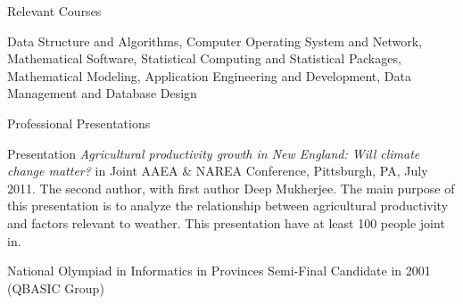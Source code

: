 \documentclass{resume} %
\newcommand{\tab}[1]{\hspace{.2667\textwidth}\rlap{#1}}
\newcommand{\itab}[1]{\hspace{0em}\rlap{#1}}
\begin{document}
\begin{rSection}{Relevant Courses} \itemsep -3pt
\item Data Structure and Algorithms, Computer Operating System and Network, Mathematical Software, Statistical Computing and Statistical Packages, Mathematical Modeling, Application Engineering and Development, Data Management and Database Design 

\end{rSection}

\begin{rSection}{Professional Presentations}{}{} \itemsep -3pt
\begin{rSubsection}{}{}{}{}
\item Presentation \textit{Agricultural productivity growth in New England: Will climate change matter?} in Joint AAEA \& NAREA Conference, Pittsburgh, PA, July 2011.
The second author, with first author Deep Mukherjee. The main purpose of this presentation is to analyze the relationship between agricultural productivity and factors relevant to weather. This presentation have at least 100 people joint in. 
\item National Olympiad in Informatics in Provinces Semi-Final Candidate in 2001 (QBASIC Group)
\end{rSubsection}
\end{rSection}
\end{document}
